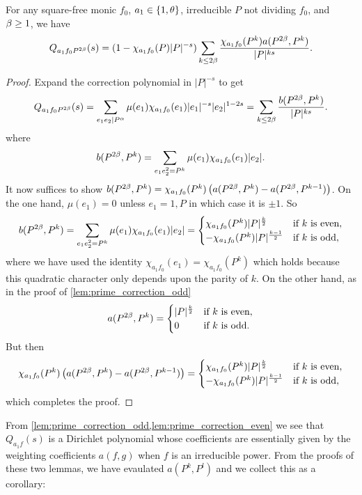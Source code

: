 \documentclass[12pt,reqno,oneside]{amsart}
\begin{document}
    \begin{lemma}\label{lem:prime_correction_even}
        For any square-free monic $f_{0}$, $a_{1} \in \{1,\theta\}$, irreducible $P$ not dividing $f_{0}$, and $\beta \ge 1$, we have
        \[
            Q_{a_{1}f_{0}P^{2\beta}}(s) = (1-\chi_{a_{1}f_{0}}(P)|P|^{-s})\sum_{k \le 2\beta}\frac{\chi_{a_{1}f_{0}}(P^{k})a(P^{2\beta},P^{k})}{|P|^{ks}}.
        \]
    \end{lemma}
    \begin{proof}
        Expand the correction polynomial in $|P|^{-s}$ to get
        \[
            Q_{a_{1}f_{0}P^{2\beta}}(s) = \sum_{e_{1}e_{2} \mid P^{\alpha}}\mu(e_{1})\chi_{a_{1}f_{0}}(e_{1})|e_{1}|^{-s}|e_{2}|^{1-2s} = \sum_{k \le 2\beta}\frac{b(P^{2\beta},P^{k})}{|P|^{ks}}.
        \]
        where
        \[
            b(P^{2\beta},P^{k}) = \sum_{e_{1}e_{2}^{2} = P^{k}}\mu(e_{1})\chi_{a_{1}f_{0}}(e_{1})|e_{2}|.
        \]
        It now suffices to show $b(P^{2\beta},P^{k}) = \chi_{a_{1}f_{0}}(P^{k})\left(a(P^{2\beta},P^{k})-a(P^{2\beta},P^{k-1})\right)$. On the one hand, $\mu(e_{1}) = 0$ unless $e_{1} = 1,P$ in which case it is $\pm1$. So
        \[
            b(P^{2\beta},P^{k}) = \sum_{e_{1}e_{2}^{2} = P^{k}}\mu(e_{1})\chi_{a_{1}f_{0}}(e_{1})|e_{2}| = \begin{cases} \chi_{a_{1}f_{0}}(P^{k})|P|^{\frac{k}{2}} & \text{if $k$ is even}, \\ -\chi_{a_{1}f_{0}}(P^{k})|P|^{\frac{k-1}{2}} & \text{if $k$ is odd}, \end{cases}
        \]
        where we have used the identity $\chi_{a_{1}f_{0}}(e_{1}) = \chi_{a_{1}f_{0}}(P^{k})$ which holds because this quadratic character only depends upon the parity of $k$. On the other hand, as in the proof of \cref{lem:prime_correction_odd} 
        \[
            a(P^{2\beta},P^{k}) = \begin{cases} |P|^{\frac{k}{2}} & \text{if $k$ is even}, \\ 0 & \text{if $k$ is odd}. \end{cases}
        \]
        But then
        \[
            \chi_{a_{1}f_{0}}(P^{k})\left(a(P^{2\beta},P^{k})-a(P^{2\beta},P^{k-1})\right) = \begin{cases} \chi_{a_{1}f_{0}}(P^{k})|P|^{\frac{k}{2}} & \text{if $k$ is even}, \\ -\chi_{a_{1}f_{0}}(P^{k})|P|^{\frac{k-1}{2}} & \text{if $k$ is odd}, \end{cases}
        \]
        which completes the proof.
    \end{proof}

    From \cref{lem:prime_correction_odd,lem:prime_correction_even} we see that $Q_{a_{1}f}(s)$ is a Dirichlet polynomial whose coefficients are essentially given by the weighting coefficients $a(f,g)$ when $f$ is an irreducible power. From the proofs of these two lemmas, we have evaulated $a(P^{k},P^{l})$ and we collect this as a corollary:
\end{document}
